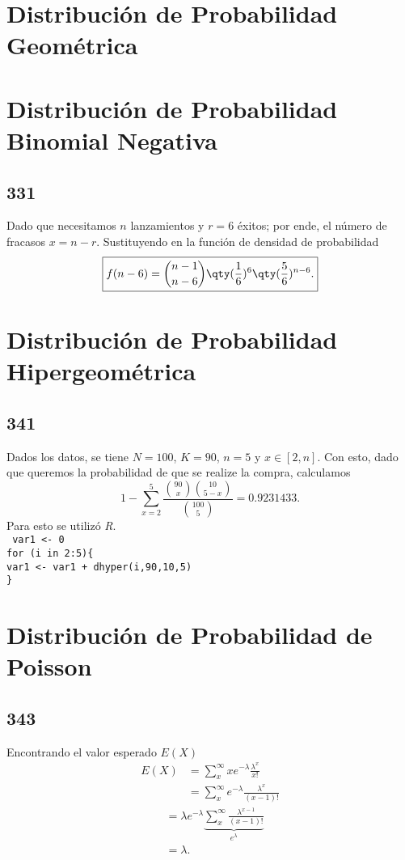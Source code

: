 \section{Distribución de Probabilidad Geométrica}
\section{Distribución de Probabilidad Binomial Negativa}
\subsection*{331}
Dado que necesitamos $n$ lanzamientos y $r = 6$ éxitos; por ende, el número de fracasos $x = n - r$. Sustituyendo en la función de densidad de probabilidad
	$$\boxed{f(n - 6) = \binom{n - 1}{n - 6} \qty(\frac{1}{6})^6 \qty(\frac{5}{6})^{n - 6} .}$$

\section{Distribución de Probabilidad Hipergeométrica}
\subsection*{341}
Dados los datos, se tiene $N = 100$, $K = 90$, $n = 5$ y $x \in [2,n]$. Con esto, dado que queremos la probabilidad de que se realize la compra, calculamos
	$$1 - \sum _{x = 2} ^5 \frac{\binom{90}{x} \binom{10}{5 - x}}{\binom{100}{5}} = 0.9231433.$$
Para esto se utilizó \textit{R}. \\
{\tt
var1 <- 0 \\
for (i in 2:5)\{ \\
var1 <- var1 + dhyper(i,90,10,5) \\
\}
}

\section{Distribución de Probabilidad de Poisson}
\subsection*{343}
Encontrando el valor esperado $E(X)$
\begin{align*}
	E(X) &= \sum _x ^\infty x e^{-\lambda} \frac{\lambda ^x}{x!} \\
	&= \sum _x ^\infty e^{-\lambda} \frac{\lambda ^x}{(x - 1)!}
\end{align*}
\begin{align*}
	&= \lambda e^{-\lambda} \underbrace{\sum _x ^\infty \frac{\lambda ^{x - 1}}{(x - 1)!}}_{e^\lambda} \\
	&= \lambda .
\end{align*}

